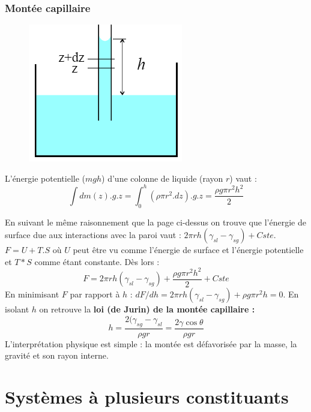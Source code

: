 \documentclass[british,french,11pt, a4paper, openany]{book}
\begin{document}
	\subsubsection{Montée capillaire}
	\begin{figure}
		\includegraphics[scale=0.4]{cp/image16.png}
	\end{figure}
	L'énergie potentielle ($mgh$) d'une colonne de liquide (rayon $r$) vaut :
	\begin{equation}
	\int dm(z).g.z = \int_0^h (\rho \pi r^2.dz).g.z = \frac{\rho g \pi r^2 h^2}{2}
	\end{equation}
	
	En suivant le même raisonnement que la page ci-dessus on trouve que l'énergie de surface due aux interactions avec la paroi vaut : $2\pi r h(\gamma_{sl}-\gamma_{sg}) + Cste$.\\
	$F = U + T.S$ où $U$ peut être vu comme l'énergie de surface et l'énergie potentielle et $T*S$ comme étant constante. Dès lors : 
	\begin{equation}
	F = 2\pi r h(\gamma_{sl}-\gamma_{sg}) + \frac{\rho g \pi r^2 h^2}{2} + Cste
	\end{equation}
	En minimisant $F$ par rapport à $h$ : $dF/dh = 2\pi r h(\gamma_{sl}-\gamma_{sg}) + \rho g \pi r^2 h = 0$. En isolant $h$ on retrouve la \textbf{loi (de Jurin) de la montée capillaire :}
	\begin{equation}
	h = \frac{2(\gamma_{sg}-\gamma_{sl}}{\rho g r} = \frac{2\gamma \cos\theta}{\rho g r}
	\end{equation}
	L'interprétation physique est simple : la montée est défavorisée par la masse, la gravité et son rayon interne.
	
	\section{Systèmes à plusieurs constituants}
\end{document}
